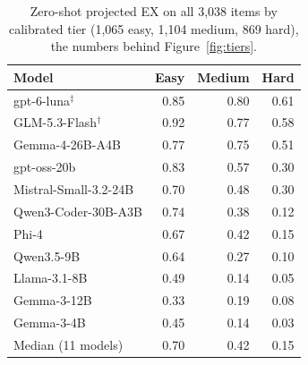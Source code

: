 \begin{table}[H]
\centering
\footnotesize
\begin{tabular}{@{}lrrr@{}}
\toprule
Model & Easy & Medium & Hard \\
\midrule
gpt-6-luna$^\ddagger$ & 0.85 & 0.80 & 0.61 \\
GLM-5.3-Flash$^\dagger$ & 0.92 & 0.77 & 0.58 \\
Gemma-4-26B-A4B & 0.77 & 0.75 & 0.51 \\
gpt-oss-20b & 0.83 & 0.57 & 0.30 \\
Mistral-Small-3.2-24B & 0.70 & 0.48 & 0.30 \\
Qwen3-Coder-30B-A3B & 0.74 & 0.38 & 0.12 \\
Phi-4 & 0.67 & 0.42 & 0.15 \\
Qwen3.5-9B & 0.64 & 0.27 & 0.10 \\
Llama-3.1-8B & 0.49 & 0.14 & 0.05 \\
Gemma-3-12B & 0.33 & 0.19 & 0.08 \\
Gemma-3-4B & 0.45 & 0.14 & 0.03 \\
\midrule
Median (11 models) & 0.70 & 0.42 & 0.15 \\
\bottomrule
\end{tabular}
\caption{Zero-shot projected EX on all 3,038 items by calibrated tier (1,065 easy, 1,104 medium, 869 hard), the numbers behind Figure~\ref{fig:tiers}.}
\label{tab:downstream_tiers}
\end{table}
